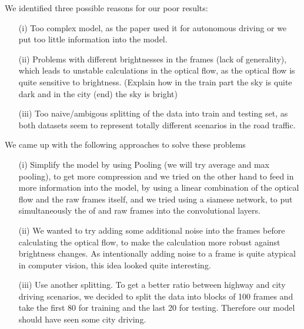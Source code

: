 \documentclass[conference]{IEEEtran}
\begin{document}
We identified three possible reasons for our poor results:
\begin{enumerate}
\item[(i)] Too complex model, as the paper used it for autonomous driving or we put too little information into the model.
\item[(ii)] Problems with different brightnesses in the frames (lack of generality), which leads to unstable calculations in the 
optical flow, as the optical flow is quite sensitive to brightness. (Explain how in the train part the sky is quite dark and in the 
city (end) the sky is bright)
\item[(iii)] Too naive/ambigous splitting of the data into train and testing set, as both datasets seem to represent totally different
scenarios in the road traffic.
\end{enumerate}
We came up with the following approaches to solve these problems
\begin{enumerate}
\item[(i)] Simplify the model by using Pooling (we will try average and max pooling), to get more compression and we tried on the
other hand to feed in more information into the model, by using a linear combination of the optical flow and the raw frames itself, and
we tried using a siamese network, to put simultaneously the of and raw frames into the convolutional layers.
\item[(ii)] We wanted to try adding some additional noise into the frames before calculating the optical flow, to make the calculation
more robust against brightness changes. As intentionally adding 
noise to a frame is quite atypical in computer vision, this idea looked quite interesting.
\item[(iii)] Use another splitting. To get a better ratio between highway and city driving scenarios, we decided to split the data into
blocks of 100 frames and take the first 80 for training and the last 20 for testing. Therefore our model should have seen some city
driving.
\end{enumerate}
\end{document}
